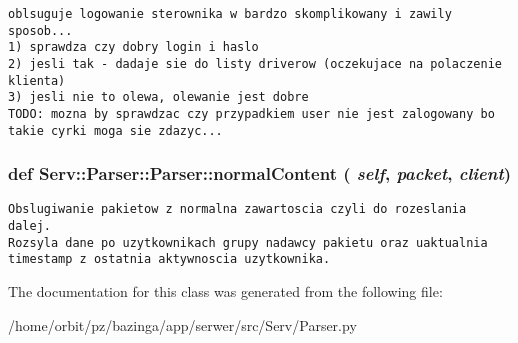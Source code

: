 \footnotesize\begin{verbatim}oblsuguje logowanie sterownika w bardzo skomplikowany i zawily sposob...
1) sprawdza czy dobry login i haslo
2) jesli tak - dadaje sie do listy driverow (oczekujace na polaczenie klienta)
3) jesli nie to olewa, olewanie jest dobre
TODO: mozna by sprawdzac czy przypadkiem user nie jest zalogowany bo takie cyrki moga sie zdazyc...

\end{verbatim}
\normalsize
 \hypertarget{class_serv_1_1_parser_1_1_parser_dc1da4d6ff7eb9dbc114f8a426274aa0}{
\subsubsection[{normalContent}]{\setlength{\rightskip}{0pt plus 5cm}def Serv::Parser::Parser::normalContent ( {\em self}, \/   {\em packet}, \/   {\em client})}}
\label{class_serv_1_1_parser_1_1_parser_dc1da4d6ff7eb9dbc114f8a426274aa0}




\footnotesize\begin{verbatim}Obslugiwanie pakietow z normalna zawartoscia czyli do rozeslania dalej.
Rozsyla dane po uzytkownikach grupy nadawcy pakietu oraz uaktualnia timestamp z ostatnia aktywnoscia uzytkownika. 

\end{verbatim}
\normalsize
 

The documentation for this class was generated from the following file:\begin{CompactItemize}
\item 
/home/orbit/pz/bazinga/app/serwer/src/Serv/Parser.py\end{CompactItemize}
